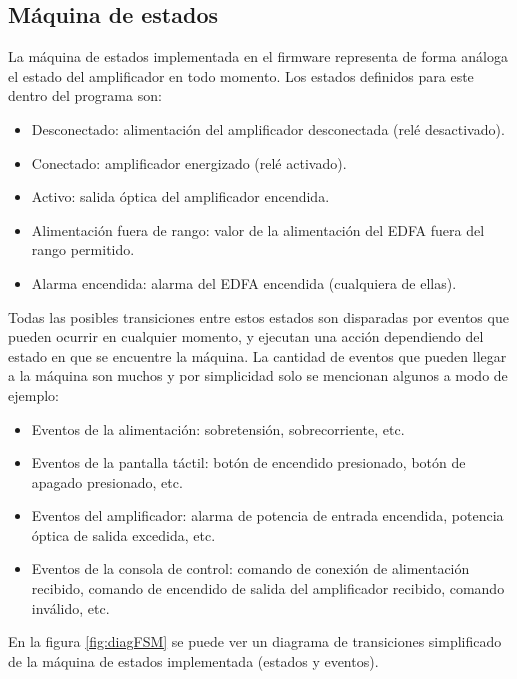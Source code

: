 \subsection{Máquina de estados}

La máquina de estados implementada en el firmware representa de forma análoga el estado del amplificador en todo momento. Los estados definidos para este dentro del programa son:

\begin{itemize}
\item Desconectado: alimentación del amplificador desconectada (relé desactivado).
\item Conectado: amplificador energizado (relé activado).
\item Activo: salida óptica del amplificador encendida.
\item Alimentación fuera de rango: valor de la alimentación del EDFA fuera del rango permitido.
\item Alarma encendida: alarma del EDFA encendida (cualquiera de ellas).
\end{itemize}

Todas las posibles transiciones entre estos estados son disparadas por eventos que pueden ocurrir en cualquier momento, y ejecutan una acción dependiendo del estado en que se encuentre la máquina. La cantidad de eventos que pueden llegar a la máquina son muchos y por simplicidad solo se mencionan algunos a modo de ejemplo:

\begin{itemize}
\item Eventos de la alimentación: sobretensión, sobrecorriente, etc.
\item Eventos de la pantalla táctil: botón de encendido presionado, botón de apagado presionado, etc.
\item Eventos del amplificador: alarma de potencia de entrada encendida, potencia óptica de salida excedida, etc.
\item Eventos de la consola de control: comando de conexión de alimentación recibido, comando de encendido de salida del amplificador recibido, comando inválido, etc.
\end{itemize}

En la figura \ref{fig:diagFSM} se puede ver un diagrama de transiciones simplificado de la máquina de estados implementada (estados y eventos).

